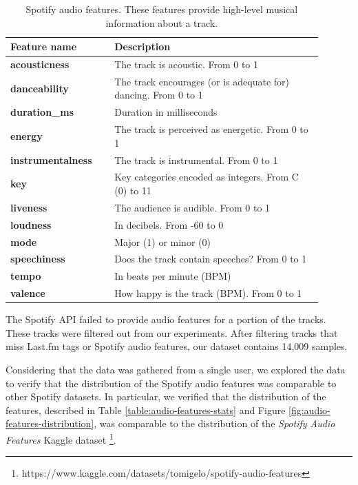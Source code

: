 \documentclass[sn-mathphys]{sn-jnl}%
\theoremstyle{thmstyleone}%
\theoremstyle{thmstyletwo}%
\theoremstyle{thmstylethree}%
\begin{document}
\begin{table}[h!]
      \centering
      \caption{Spotify audio features. These features provide high-level musical information about a track.} \label{table:spotify-features}
      \begin{tabular}{p{0.3\linewidth}p{0.6\linewidth}}
          \toprule
          \bfseries \textbf{Feature name} & \textbf{Description} \\
          \midrule
          \textbf{acousticness} & The track is acoustic. From 0 to 1 \\
          \textbf{danceability} & The track encourages (or is adequate for) dancing. From 0 to 1 \\
          \textbf{duration\_ms}  &  Duration in milliseconds \\
          \textbf{energy}  &  The track is perceived as energetic. From 0 to 1\\
          \textbf{instrumentalness}  &  The track is instrumental. From 0 to 1 \\
          \textbf{key}  &  Key categories encoded as integers. From C (0) to 11 \\
          \textbf{liveness}  &  The audience is audible. From 0 to 1\\
          \textbf{loudness}  &  In decibels. From -60 to 0 \\
          \textbf{mode}  & Major (1) or minor (0) \\
          \textbf{speechiness}  & Does the track contain speeches? From 0 to 1 \\
          \textbf{tempo}  & In beats per minute (BPM) \\
          \textbf{valence} & How happy is the track (BPM). From 0 to 1 \\
          \bottomrule
      \end{tabular}
  \end{table}

The Spotify API failed to provide audio features for a portion of the tracks.
These tracks were filtered out from our experiments.
After filtering tracks that miss Last.fm tags or Spotify audio features,
our dataset contains 14,009 samples.

Considering that the data was gathered from a single user,
we explored the data to verify that the distribution of the Spotify audio features
was comparable to other Spotify datasets.
In particular, we verified that the distribution of the features,
described in Table \ref{table:audio-features-stats} and Figure \ref{fig:audio-features-distribution},
was comparable to the distribution of the \emph{Spotify Audio Features} Kaggle dataset
\footnote[6]{https://www.kaggle.com/datasets/tomigelo/spotify-audio-features}.
\end{document}
